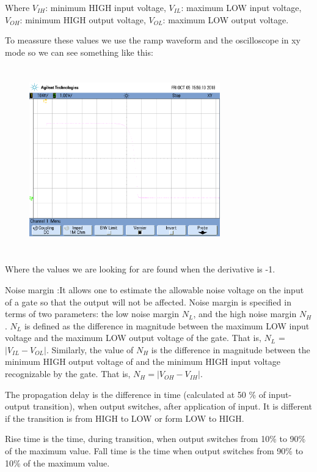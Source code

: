 Where $V_{IH}$: minimum HIGH input voltage, $V_{IL}$: maximum LOW input voltage, $V_{OH}$: minimum HIGH output voltage, $V_{OL}$: maximum LOW output voltage.

To meassure these values we use the ramp waveform and the oscilloscope in xy mode so we can see something like this:
\begin{figure}[H] 
    \begin{center}
    \includegraphics[width=8.25cm,height=8cm]{data/xy_ttl_bjt.png}
    \end{center}
    \caption{}
    \label{fig:measures}
    \end{figure}     
Where the values we are looking for are found when the derivative is -1.

Noise margin :It allows one to estimate the allowable noise voltage on the input of a 
gate so that the output will not be affected. Noise margin is specified
 in terms of two parameters: the low noise margin $N_{L}$, and the high noise 
 margin $N_{H}$ . $N_{L}$ is defined as the difference in magnitude
  between the maximum LOW input voltage and the maximum 
  LOW output voltage of the gate. That is, $N_{L}$ =$|V_{IL} - V_{OL}|$.
   Similarly, the value of $N_{H}$ is the difference in 
   magnitude between the minimum HIGH output voltage of 
   and the minimum HIGH input voltage recognizable by 
   the gate. That is, $N_{H} =|V_{OH} - V_{IH}|.$ 


The propagation delay  is the difference in time (calculated at 50
\% of input-output transition), when output switches, after 
application of input. It is different if the transition is
 from HIGH to LOW or form LOW to HIGH.

 Rise time is the time, during transition, when output switches from 10\% to 90\% of the maximum value.
Fall time is the time when output switches from 90\% to 10\% of the maximum value.

